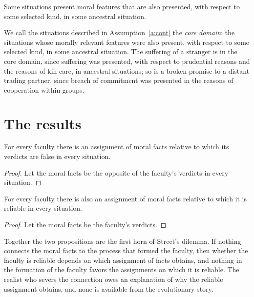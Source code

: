 \documentclass{situationist-preprint}
\begin{document}
\begin{assumption}[Continuity]\label{a:cont}
Some situations present moral features that are also presented, with respect to some selected kind, in some ancestral situation.
\end{assumption}

We call the situations described in Assumption~\ref{a:cont} the \emph{core domain}: the situations whose morally relevant features were also present, with respect to some selected kind, in some ancestral situation. The suffering of a stranger is in the core domain, since suffering was presented, with respect to prudential reasons and the reasons of kin care, in ancestral situations; so is a broken promise to a distant trading partner, since breach of commitment was presented in the reasons of cooperation within groups.

\section{The results}\label{s:results}

\begin{proposition}\label{p:noguarantee}
For every faculty there is an assignment of moral facts relative to which its verdicts are false in every situation.
\end{proposition}

\begin{proof}
Let the moral facts be the opposite of the faculty's verdicts in every situation.
\end{proof}

\begin{proposition}[Coincidence]\label{p:coincidence}
For every faculty there is also an assignment of moral facts relative to which it is reliable in every situation.
\end{proposition}

\begin{proof}
Let the moral facts be the faculty's verdicts.
\end{proof}

Together the two propositions are the first horn of Street's dilemma. If nothing connects the moral facts to the process that formed the faculty, then whether the faculty is reliable depends on which assignment of facts obtains, and nothing in the formation of the faculty favors the assignments on which it is reliable. The realist who severs the connection owes an explanation of why the reliable assignment obtains, and none is available from the evolutionary story.
\end{document}
